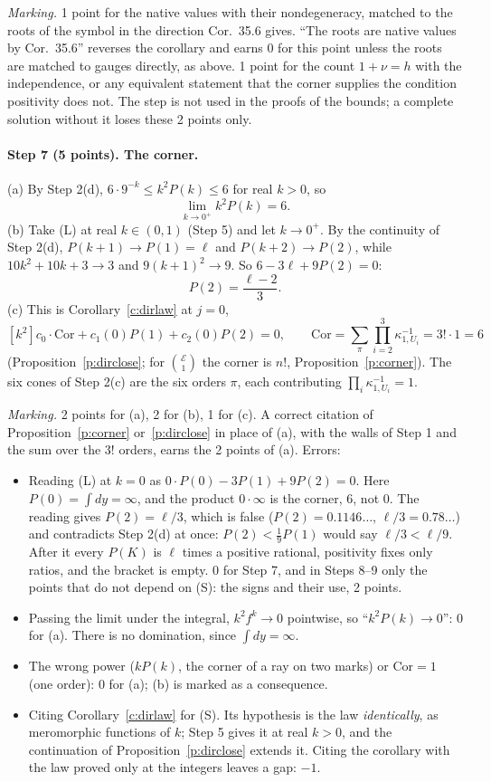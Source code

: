 \documentclass[11pt]{article}
\newcommand{\cE}{\mathcal E}
\theoremstyle{plain}
\theoremstyle{definition}
\theoremstyle{remark}
\begin{document}
\smallskip\noindent\emph{Marking.} 1 point for the native values with their nondegeneracy, matched to the roots of the symbol in the direction Cor.~35.6 gives. ``The roots are native values by Cor.~35.6'' reverses the corollary and earns 0 for this point unless the roots are matched to gauges directly, as above. 1 point for the count $1+\nu=h$ with the independence, or any equivalent statement that the corner supplies the condition positivity does not. The step is not used in the proofs of the bounds; a complete solution without it loses these 2 points only.

\paragraph{Step 7 (5 points). The corner.}
(a) By Step 2(d), $6\cdot9^{-k}\le k^2P(k)\le6$ for real $k>0$, so
\[
\lim_{k\to0^+}k^2P(k)=6 .
\]
(b) Take (L) at real $k\in(0,1)$ (Step 5) and let $k\to0^+$. By the continuity of Step 2(d), $P(k+1)\to P(1)=\ell$ and $P(k+2)\to P(2)$, while $10k^2+10k+3\to3$ and $9(k+1)^2\to9$. So $6-3\ell+9P(2)=0$:
\begin{equation}\tag{S}
P(2)=\frac{\ell-2}3 .
\end{equation}
(c) This is Corollary~\ref{c:dirlaw} at $j=0$,
\[
[k^2]c_0\cdot\mathrm{Cor}+c_1(0)P(1)+c_2(0)P(2)=0,\qquad \mathrm{Cor}=\sum_\pi\prod_{i=2}^3\kappa_{1,U_i}^{-1}=3!\cdot1=6
\]
(Proposition~\ref{p:dirclose}; for $\binom{\cE}1$ the corner is $n!$, Proposition~\ref{p:corner}). The six cones of Step 2(c) are the six orders $\pi$, each contributing $\prod_i\kappa_{1,U_i}^{-1}=1$.

\smallskip\noindent\emph{Marking.} 2 points for (a), 2 for (b), 1 for (c). A correct citation of Proposition~\ref{p:corner} or~\ref{p:dirclose} in place of (a), with the walls of Step 1 and the sum over the $3!$ orders, earns the 2 points of (a). Errors:
\begin{itemize}
\item Reading (L) at $k=0$ as $0\cdot P(0)-3P(1)+9P(2)=0$. Here $P(0)=\int dy=\infty$, and the product $0\cdot\infty$ is the corner, $6$, not $0$. The reading gives $P(2)=\ell/3$, which is false ($P(2)=0.1146\ldots$, $\ell/3=0.78\ldots$) and contradicts Step 2(d) at once: $P(2)<\frac19P(1)$ would say $\ell/3<\ell/9$. After it every $P(K)$ is $\ell$ times a positive rational, positivity fixes only ratios, and the bracket is empty. 0 for Step 7, and in Steps 8--9 only the points that do not depend on (S): the signs and their use, 2 points.
\item Passing the limit under the integral, $k^2f^k\to0$ pointwise, so ``$k^2P(k)\to0$'': 0 for (a). There is no domination, since $\int dy=\infty$.
\item The wrong power ($kP(k)$, the corner of a ray on two marks) or $\mathrm{Cor}=1$ (one order): 0 for (a); (b) is marked as a consequence.
\item Citing Corollary~\ref{c:dirlaw} for (S). Its hypothesis is the law \emph{identically}, as meromorphic functions of $k$; Step 5 gives it at real $k>0$, and the continuation of Proposition~\ref{p:dirclose} extends it. Citing the corollary with the law proved only at the integers leaves a gap: $-1$.
\end{itemize}
\end{document}
